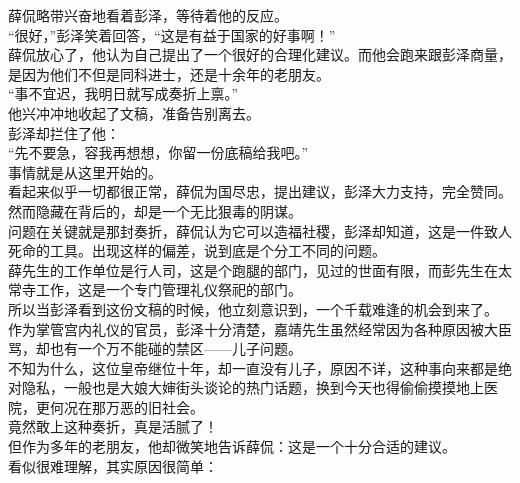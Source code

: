 \begin{multicols}{\theparacolNo}
薛侃略带兴奋地看着彭泽，等待着他的反应。\\

“很好，”彭泽笑着回答，“这是有益于国家的好事啊！”\\

薛侃放心了，他认为自己提出了一个很好的合理化建议。而他会跑来跟彭泽商量，是因为他们不但是同科进士，还是十余年的老朋友。\\

“事不宜迟，我明日就写成奏折上禀。”\\

他兴冲冲地收起了文稿，准备告别离去。\\

彭泽却拦住了他：\\

“先不要急，容我再想想，你留一份底稿给我吧。”\\

事情就是从这里开始的。\\

看起来似乎一切都很正常，薛侃为国尽忠，提出建议，彭泽大力支持，完全赞同。然而隐藏在背后的，却是一个无比狠毒的阴谋。\\

问题在关键就是那封奏折，薛侃认为它可以造福社稷，彭泽却知道，这是一件致人死命的工具。出现这样的偏差，说到底是个分工不同的问题。\\

薛先生的工作单位是行人司，这是个跑腿的部门，见过的世面有限，而彭先生在太常寺工作，这是一个专门管理礼仪祭祀的部门。\\

所以当彭泽看到这份文稿的时候，他立刻意识到，一个千载难逢的机会到来了。\\

作为掌管宫内礼仪的官员，彭泽十分清楚，嘉靖先生虽然经常因为各种原因被大臣骂，却也有一个万不能碰的禁区——儿子问题。\\

不知为什么，这位皇帝继位十年，却一直没有儿子，原因不详，这种事向来都是绝对隐私，一般也是大娘大婶街头谈论的热门话题，换到今天也得偷偷摸摸地上医院，更何况在那万恶的旧社会。\\

竟然敢上这种奏折，真是活腻了！\\

但作为多年的老朋友，他却微笑地告诉薛侃：这是一个十分合适的建议。\\

看似很难理解，其实原因很简单：\\


\end{multicols}
